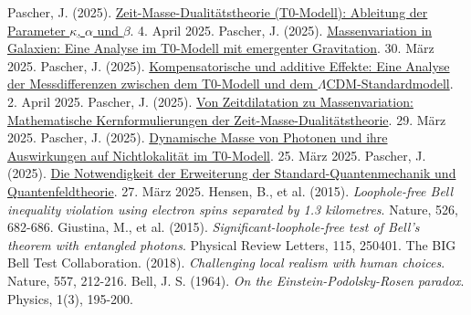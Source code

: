 \documentclass[a4paper,12pt]{article}
\theoremstyle{definition}
\theoremstyle{remark}
\begin{document}
	\begin{thebibliography}{99}
		 Pascher, J. (2025). \href{https://github.com/jpascher/T0-Time-Mass-Duality/tree/main/2/pdf/Deutsch/Zeit-Masse-Dualitätstheorie (T0-Modell) Herleitung der Parameter kappa, alpha und beta.pdf}{Zeit-Masse-Dualitätstheorie (T0-Modell): Ableitung der Parameter \(\kappa\), \(\alpha\) und \(\beta\)}. 4. April 2025.
		 Pascher, J. (2025). \href{https://github.com/jpascher/T0-Time-Mass-Duality/tree/main/2/pdf/Deutsch/Massenvariation in Galaxien.pdf}{Massenvariation in Galaxien: Eine Analyse im T0-Modell mit emergenter Gravitation}. 30. März 2025.
		 Pascher, J. (2025). \href{https://github.com/jpascher/T0-Time-Mass-Duality/tree/main/2/pdf/Deutsch/Analyse der Messdifferenzen zwischen dem T0-Modell und dem Standardmodell.pdf}{Kompensatorische und additive Effekte: Eine Analyse der Messdifferenzen zwischen dem T0-Modell und dem \(\Lambda\)CDM-Standardmodell}. 2. April 2025.
		 Pascher, J. (2025). \href{https://github.com/jpascher/T0-Time-Mass-Duality/tree/main/2/pdf/Deutsch/Mathematische Formulierungen der Zeit-Masse-Dualitätstheorie mit Lagrange.pdf}{Von Zeitdilatation zu Massenvariation: Mathematische Kernformulierungen der Zeit-Masse-Dualitätstheorie}. 29. März 2025.
		 Pascher, J. (2025). \href{https://github.com/jpascher/T0-Time-Mass-Duality/tree/main/2/pdf/Deutsch/Dynamische Masse von Photonen und ihre Implikationen für Nichtlokalität.tex}{Dynamische Masse von Photonen und ihre Auswirkungen auf Nichtlokalität im T0-Modell}. 25. März 2025.
		 Pascher, J. (2025). \href{https://github.com/jpascher/T0-Time-Mass-Duality/tree/main/2/pdf/Deutsch/Die Notwendigkeit einer Erweiterung der Standard-Quantenmechanik und Quantenfeldtheorie.pdf}{Die Notwendigkeit der Erweiterung der Standard-Quantenmechanik und Quantenfeldtheorie}. 27. März 2025.
		 Hensen, B., et al. (2015). \textit{Loophole-free Bell inequality violation using electron spins separated by 1.3 kilometres}. Nature, 526, 682-686.
		 Giustina, M., et al. (2015). \textit{Significant-loophole-free test of Bell’s theorem with entangled photons}. Physical Review Letters, 115, 250401.
		 The BIG Bell Test Collaboration. (2018). \textit{Challenging local realism with human choices}. Nature, 557, 212-216.
		 Bell, J. S. (1964). \textit{On the Einstein-Podolsky-Rosen paradox}. Physics, 1(3), 195-200.

\end{thebibliography}
\end{document}
